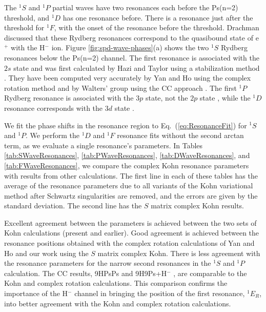 \documentclass[preprint,showpacs,showkeys,preprintnumbers,amsmath,amssymb,longbibliography,pra,aps]{revtex4-1}
\begin{document}
The $^1S$ and $^1P$ partial waves have two resonances each before the Ps(n=2) 
threshold, and $^1D$ has one resonance before. There is a resonance just 
after the threshold for $^1F$, with the onset of the resonance before the 
threshold. Drachman \cite{Drachman1979} discussed that these Rydberg 
resonances correspond to the quasibound state of e$^+$ with the H$^-$ ion.
Figure \ref{fig:spd-wave-phases}(a) shows the 
two $^1S$ Rydberg resonances below the Ps(n=2) channel. The first resonance 
is associated with the $2s$ state \cite{DiRienzi2002b} and was first 
calculated by Hazi and Taylor using a stabilization method \cite{Hazi1970}. 
They have been computed very accurately by Yan and Ho using the complex 
rotation method \cite{Yan1999} and by Walters' group using the CC 
approach \cite{Walters2004}. The first $^1P$ Rydberg resonance is associated
with the $3p$ state, not the $2p$ state \cite{DiRienzi2002b}, while the $^1D$ 
resonance corresponds with the $3d$ state \cite{DiRienzi2002a}.

We fit the phase shifts in the resonance region to Eq.~(\ref{eq:ResonanceFit})
for $^1S$ and $^1P$. We perform the $^1D$ and $^1F$ resonance fits without 
the second arctan term, as we evaluate a single resonance's parameters. In 
Tables \ref{tab:SWaveResonances}, \ref{tab:PWaveResonances},
\ref{tab:DWaveResonances}, and \ref{tab:FWaveResonances}, we compare the
complex Kohn resonance parameters with results from other calculations. The
first line in each of these tables has the average of the resonance parameters
due to all variants of the Kohn variational method after Schwartz singularities
are removed, and the errors are given by the standard deviation. The second 
line has the $S$ matrix complex Kohn results.

Excellent agreement between the parameters is achieved between the two sets 
of Kohn calculations (present and earlier). Good agreement is achieved 
between the resonance positions obtained with the complex rotation 
calculations of Yan and Ho \cite{Yan1999,Yan1998a,Ho1998,Ho2000} and our 
work using the $S$ matrix complex Kohn. There is less agreement with the
resonance parameters for the narrow second resonances in the $^1S$ and $^1P$
calculation. The CC results, 9HPsPs \cite{Blackwood2002} and
9H9Ps+H$^-$ \cite{Walters2004},
are comparable to the Kohn and complex rotation calculations. This 
comparison confirms the importance of the H$^-$ channel in bringing the 
position of the first resonance, $^1E_R$, into better agreement with the Kohn 
and complex rotation calculations.
\end{document}
